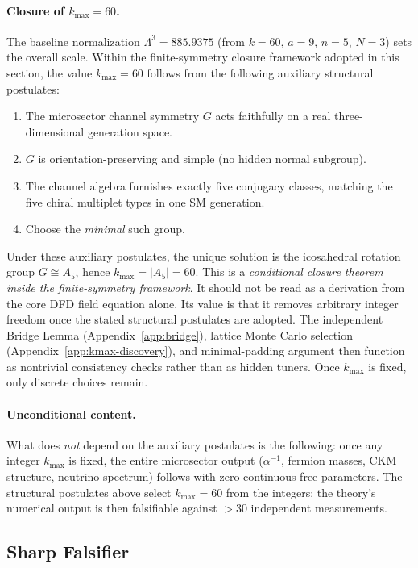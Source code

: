 \paragraph{Closure of $k_{\max} = 60$.}
The baseline normalization $\Lambda^3 = 885.9375$ (from $k = 60$, $a = 9$, $n = 5$, $N = 3$) sets the overall scale.  Within the finite-symmetry closure framework adopted in this section, the value $k_{\max}=60$ follows from the following auxiliary structural postulates:
\begin{enumerate}
\item The microsector channel symmetry $G$ acts faithfully on a real three-dimensional generation space.
\item $G$ is orientation-preserving and simple (no hidden normal subgroup).
\item The channel algebra furnishes exactly five conjugacy classes, matching the five chiral multiplet types in one SM generation.
\item Choose the \emph{minimal} such group.
\end{enumerate}
Under these auxiliary postulates, the unique solution is the icosahedral rotation group $G \cong A_5$, hence $k_{\max} = |A_5| = 60$.  This is a \emph{conditional closure theorem inside the finite-symmetry framework}.  It should not be read as a derivation from the core DFD field equation alone.  Its value is that it removes arbitrary integer freedom once the stated structural postulates are adopted.  The independent Bridge Lemma (Appendix~\ref{app:bridge}), lattice Monte Carlo selection (Appendix~\ref{app:kmax-discovery}), and minimal-padding argument then function as nontrivial consistency checks rather than as hidden tuners.  Once $k_{\max}$ is fixed, only discrete choices remain.

\paragraph{Unconditional content.}
What does \emph{not} depend on the auxiliary postulates is the following: once any integer $k_{\max}$ is fixed, the entire microsector output ($\alpha^{-1}$, fermion masses, CKM structure, neutrino spectrum) follows with zero continuous free parameters.  The structural postulates above select $k_{\max}=60$ from the integers; the theory's numerical output is then falsifiable against ${>}30$ independent measurements.

\subsection{Sharp Falsifier}\label{sec:alpha-falsifier}

